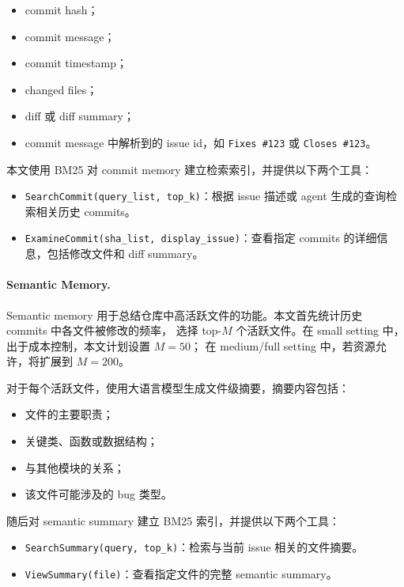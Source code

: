 \begin{itemize}
    \item commit hash；
    \item commit message；
    \item commit timestamp；
    \item changed files；
    \item diff 或 diff summary；
    \item commit message 中解析到的 issue id，如 \texttt{Fixes \#123} 或 \texttt{Closes \#123}。
\end{itemize}

本文使用 BM25 对 commit memory 建立检索索引，并提供以下两个工具：

\begin{itemize}
    \item \texttt{SearchCommit(query\_list, top\_k)}：根据 issue 描述或 agent 生成的查询检索相关历史 commits。
    \item \texttt{ExamineCommit(sha\_list, display\_issue)}：查看指定 commits 的详细信息，包括修改文件和 diff summary。
\end{itemize}

\paragraph{Semantic Memory.}
Semantic memory 用于总结仓库中高活跃文件的功能。本文首先统计历史 commits 中各文件被修改的频率，
选择 top-$M$ 个活跃文件。在 small setting 中，出于成本控制，本文计划设置 $M=50$；
在 medium/full setting 中，若资源允许，将扩展到 $M=200$。

对于每个活跃文件，使用大语言模型生成文件级摘要，摘要内容包括：

\begin{itemize}
    \item 文件的主要职责；
    \item 关键类、函数或数据结构；
    \item 与其他模块的关系；
    \item 该文件可能涉及的 bug 类型。
\end{itemize}

随后对 semantic summary 建立 BM25 索引，并提供以下两个工具：

\begin{itemize}
    \item \texttt{SearchSummary(query, top\_k)}：检索与当前 issue 相关的文件摘要。
    \item \texttt{ViewSummary(file)}：查看指定文件的完整 semantic summary。
\end{itemize}

